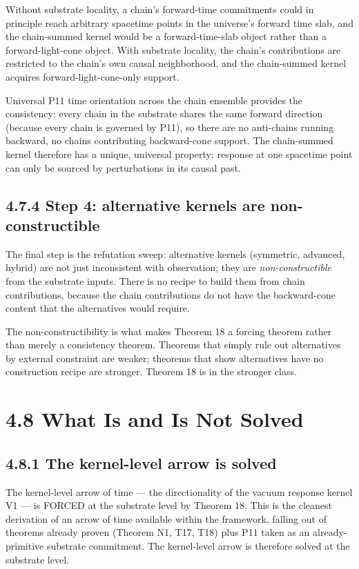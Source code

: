 \documentclass[11pt]{book}
\begin{document}
Without substrate locality, a chain's forward-time commitments could in principle reach arbitrary spacetime points in the universe's forward time slab, and the chain-summed kernel would be a forward-time-slab object rather than a forward-light-cone object. With substrate locality, the chain's contributions are restricted to the chain's own causal neighborhood, and the chain-summed kernel acquires forward-light-cone-only support.

Universal P11 time orientation across the chain ensemble provides the consistency: every chain in the substrate shares the same forward direction (because every chain is governed by P11), so there are no anti-chains running backward, no chains contributing backward-cone support. The chain-summed kernel therefore has a unique, universal property: response at one spacetime point can only be sourced by perturbations in its causal past.

\subsection{4.7.4 Step 4: alternative kernels are non-constructible}

The final step is the refutation sweep: alternative kernels (symmetric, advanced, hybrid) are not just inconsistent with observation; they are \textit{non-constructible} from the substrate inputs. There is no recipe to build them from chain contributions, because the chain contributions do not have the backward-cone content that the alternatives would require.

The non-constructibility is what makes Theorem 18 a forcing theorem rather than merely a consistency theorem. Theorems that simply rule out alternatives by external constraint are weaker; theorems that show alternatives have no construction recipe are stronger. Theorem 18 is in the stronger class.

\section{4.8 What Is and Is Not Solved}

\subsection{4.8.1 The kernel-level arrow is solved}

The kernel-level arrow of time — the directionality of the vacuum response kernel V1 — is FORCED at the substrate level by Theorem 18. This is the cleanest derivation of an arrow of time available within the framework, falling out of theorems already proven (Theorem N1, T17, T18) plus P11 taken as an already-primitive substrate commitment. The kernel-level arrow is therefore solved at the substrate level.
\end{document}

